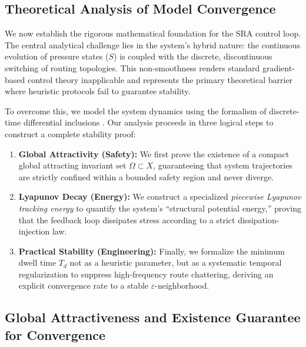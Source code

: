 \documentclass[journal]{IEEEtran}
\theoremstyle{plain}
\theoremstyle{definition}
\begin{document}
\subsection{Theoretical Analysis of Model Convergence}
\label{sec:convergence_analysis}

We now establish the rigorous mathematical foundation for the SRA control loop. 
The central analytical challenge lies in the system's hybrid nature: the continuous evolution of pressure states ($S$) is coupled with the discrete, discontinuous switching of routing topologies. 
This non-smoothness renders standard gradient-based control theory inapplicable and represents the primary theoretical barrier where heuristic protocols fail to guarantee stability.

To overcome this, we model the system dynamics using the formalism of discrete-time differential inclusions \cite{Aubin1984Differential}. 
Our analysis proceeds in three logical steps to construct a complete stability proof:
\begin{enumerate}
    \item \textbf{Global Attractivity (Safety):} We first prove the existence of a compact global attracting invariant set $\Omega \subset X$, guaranteeing that system trajectories are strictly confined within a bounded safety region and never diverge.
    \item \textbf{Lyapunov Decay (Energy):} We construct a specialized \textit{piecewise Lyapunov tracking energy} to quantify the system's ``structural potential energy,'' proving that the feedback loop dissipates stress according to a strict dissipation-injection law.
    \item \textbf{Practical Stability (Engineering):} Finally, we formalize the minimum dwell time $T_d$ not as a heuristic parameter, but as a systematic temporal regularization to suppress high-frequency route chattering, deriving an explicit convergence rate to a stable $\varepsilon$-neighborhood.
\end{enumerate}



\subsection{Global Attractiveness and Existence Guarantee for Convergence}
\label{subsec:attractivity}
\end{document}
